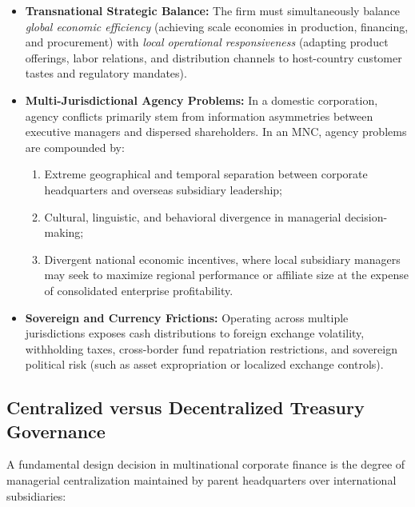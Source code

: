 \begin{itemize}[leftmargin=1.5em]
    \item \textbf{Transnational Strategic Balance:} The firm must simultaneously balance \textit{global economic efficiency} (achieving scale economies in production, financing, and procurement) with \textit{local operational responsiveness} (adapting product offerings, labor relations, and distribution channels to host-country customer tastes and regulatory mandates).
    \item \textbf{Multi-Jurisdictional Agency Problems:} In a domestic corporation, agency conflicts primarily stem from information asymmetries between executive managers and dispersed shareholders. In an MNC, agency problems are compounded by:
    \begin{enumerate}[label=(\alph*), noitemsep]
        \item Extreme geographical and temporal separation between corporate headquarters and overseas subsidiary leadership;
        \item Cultural, linguistic, and behavioral divergence in managerial decision-making;
        \item Divergent national economic incentives, where local subsidiary managers may seek to maximize regional performance or affiliate size at the expense of consolidated enterprise profitability.
    \end{enumerate}
    \item \textbf{Sovereign and Currency Frictions:} Operating across multiple jurisdictions exposes cash distributions to foreign exchange volatility, withholding taxes, cross-border fund repatriation restrictions, and sovereign political risk (such as asset expropriation or localized exchange controls).
\end{itemize}

\vspace{0.5em}

\subsection{Centralized versus Decentralized Treasury Governance}
A fundamental design decision in multinational corporate finance is the degree of managerial centralization maintained by parent headquarters over international subsidiaries:

